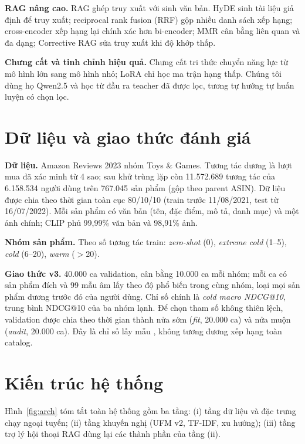 \documentclass[conference,a4paper]{IEEEtran}
\begin{document}
\textbf{RAG nâng cao.} RAG \cite{lewis2020} ghép truy xuất với sinh văn bản. HyDE \cite{gao2023hyde} sinh tài liệu giả định để truy xuất; reciprocal rank fusion (RRF) \cite{cormack2009} gộp nhiều danh sách xếp hạng; cross-encoder \cite{nogueira2019} xếp hạng lại chính xác hơn bi-encoder; MMR \cite{carbonell1998} cân bằng liên quan và đa dạng; Corrective RAG \cite{yan2024crag} sửa truy xuất khi độ khớp thấp.

\textbf{Chưng cất và tinh chỉnh hiệu quả.} Chưng cất tri thức \cite{hinton2015} chuyển năng lực từ mô hình lớn sang mô hình nhỏ; LoRA \cite{hu2022lora} chỉ học ma trận hạng thấp. Chúng tôi dùng họ Qwen2.5 \cite{qwen2024} và học từ đầu ra teacher đã được lọc, tương tự hướng tự huấn luyện có chọn lọc.

\section{Dữ liệu và giao thức đánh giá}
\textbf{Dữ liệu.} Amazon Reviews 2023 \cite{hou2024} nhóm Toys \& Games. Tương tác dương là lượt mua đã xác minh từ 4 sao; sau khử trùng lặp còn 11.572.689 tương tác của 6.158.534 người dùng trên 767.045 sản phẩm (gộp theo parent ASIN). Dữ liệu được chia theo thời gian toàn cục 80/10/10 (train trước 11/08/2021, test từ 16/07/2022). Mỗi sản phẩm có văn bản (tên, đặc điểm, mô tả, danh mục) và một ảnh chính; CLIP phủ 99,99\% văn bản và 98,91\% ảnh.

\textbf{Nhóm sản phẩm.} Theo số tương tác train: \emph{zero-shot} (0), \emph{extreme cold} (1--5), \emph{cold} (6--20), \emph{warm} ($>$20).

\textbf{Giao thức v3.} 40.000 ca validation, cân bằng 10.000 ca mỗi nhóm; mỗi ca có sản phẩm đích và 99 mẫu âm lấy theo độ phổ biến trong cùng nhóm, loại mọi sản phẩm dương trước đó của người dùng. Chỉ số chính là \emph{cold macro NDCG@10}, trung bình NDCG@10 \cite{jarvelin2002} của ba nhóm lạnh. Để chọn tham số không thiên lệch, validation được chia theo thời gian thành nửa sớm (\emph{fit}, 20.000 ca) và nửa muộn (\emph{audit}, 20.000 ca). Đây là chỉ số lấy mẫu \cite{krichene2020}, không tương đương xếp hạng toàn catalog.

\section{Kiến trúc hệ thống}
Hình~\ref{fig:arch} tóm tắt toàn hệ thống gồm ba tầng: (i) tầng dữ liệu và đặc trưng chạy ngoại tuyến; (ii) tầng khuyến nghị (UFM v2, TF-IDF, xu hướng); (iii) tầng trợ lý hội thoại RAG dùng lại các thành phần của tầng (ii).
\end{document}
